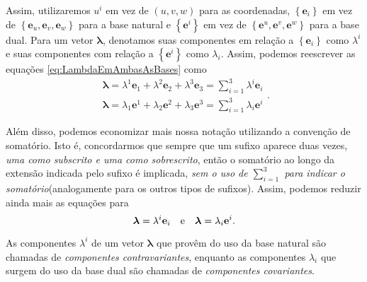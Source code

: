 Assim, utilizaremos $u^i$ em vez de $(u,v,w)$ para as coordenadas, $\left\{\mathbf{e}_{i}\right\}$ em vez de $\left\{\mathbf{e}_{u}, \mathbf{e}_{v}, \mathbf{e}_{w}\right\}$ para a base natural e $\left\{\mathbf{e}^{i}\right\}$ em vez de $\left\{\mathbf{e}^{u}, \mathbf{e}^{v}, \mathbf{e}^{w}\right\}$ para a base dual. Para um vetor $\boldsymbol{\lambda}$, denotamos suas componentes em relação a $\left\{\mathbf{e}_{i}\right\}$ como $\lambda^i$ e suas componentes com relação a $\left\{\mathbf{e}^{i}\right\}$ como $\lambda_i$.
Assim, podemos reescrever as equações \eqref{eq:LambdaEmAmbasAsBases} como 
\[
\begin{array}{l}{\boldsymbol{\lambda}=\lambda^{1} \mathbf{e}_{1}+\lambda^{2} \mathbf{e}_{2}+\lambda^{3} \mathbf{e}_{3}=\displaystyle\sum_{i=1}^{3} \lambda^{i} \mathbf{e}_{i}} \\ {\boldsymbol{\lambda}=\lambda_{1} \mathbf{e}^{1}+\lambda_{2} \mathbf{e}^{2}+\lambda_{3} \mathbf{e}^{3}=\displaystyle\sum_{i=1}^{3} \lambda_{i} \mathbf{e}^{i}}\end{array} .
\]

Além disso, podemos economizar mais nossa notação utilizando a convenção de somatório. Isto é, concordarmos que sempre que um sufixo aparece duas vezes, \textit{uma como subscrito e uma como sobrescrito}, então o somatório ao longo da extensão indicada pelo sufixo é implicada, \textit{sem o uso de $\sum_{i=1}^3$ para indicar o somatório}(analogamente para os outros tipos de sufixos). Assim, podemos reduzir ainda mais as equações para
\begin{equation}\label{eq:LambdaEmAmbasAsBasesConvencaoSomatorio}
	\boldsymbol{\lambda}=\lambda^{i} \mathbf{e}_{i} \qq{e} \boldsymbol{\lambda}=\lambda_{i} \mathbf{e}^{i} .
\end{equation}

As componentes $\lambda^i$ de um vetor $\boldsymbol{\lambda}$ que provêm do uso da base natural são chamadas de \textit{componentes contravariantes}, enquanto as componentes $\lambda_i$ que surgem do uso da base dual são chamadas de \textit{componentes covariantes}.

